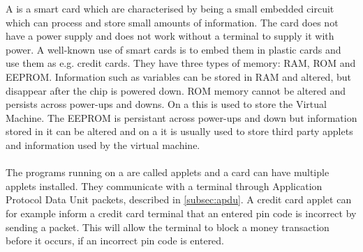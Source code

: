 A \jc is a smart card which are characterised by being a small embedded circuit which can process and store small amounts of information. The card does not have a power supply and does not work without a terminal to supply it with power. A well-known use of smart cards is to embed them in plastic cards and use them as e.g. credit cards. They have three types of memory: RAM, ROM and EEPROM. Information such as variables can be stored in RAM and altered, but disappear after the chip is powered down. ROM memory cannot be altered and persists across power-ups and downs. On a \jc this is used to store the \jc Virtual Machine. The EEPROM is persistant across power-ups and down but information stored in it can be altered and on a \jc it is usually used to store third party applets and information used by the virtual machine.\\\\
The programs running on a \jc are called applets and a card can have multiple applets installed. They communicate with a terminal through Application Protocol Data Unit packets, described in \cref{subsec:apdu}. A credit card applet can for example inform a credit card terminal that an entered pin code is incorrect by sending a packet. This will allow the terminal to block a money transaction before it occurs, if an incorrect pin code is entered.